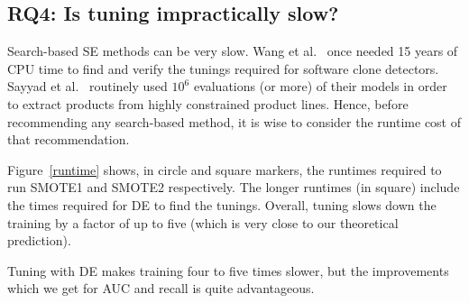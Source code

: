 \subsection{\textbf{RQ4: Is tuning impractically slow?}}

Search-based SE methods can be very slow. Wang et al.~\cite{wang2013searching} once needed 15
years of CPU time to find and verify the tunings required for software
clone detectors. Sayyad et al.~\cite{sayyad2013scalable} routinely used
$10^6$ evaluations (or more) of their models in order to extract
products from highly constrained product
lines. Hence, before recommending any
search-based method, it is wise to consider the runtime cost of that
recommendation.

 Figure~\ref{runtime} shows,  in circle and square markers, the
  runtimes required to run SMOTE1 and SMOTE2 respectively.  The
  longer runtimes (in square) include the times required for DE to find
  the tunings. Overall, tuning slows down the training by a factor of up to
  five (which is very close to our theoretical prediction).

\begin{lesson1}
    Tuning with DE makes training four to five times slower, but the improvements which we get for AUC and recall is quite advantageous.
\end{lesson1}
